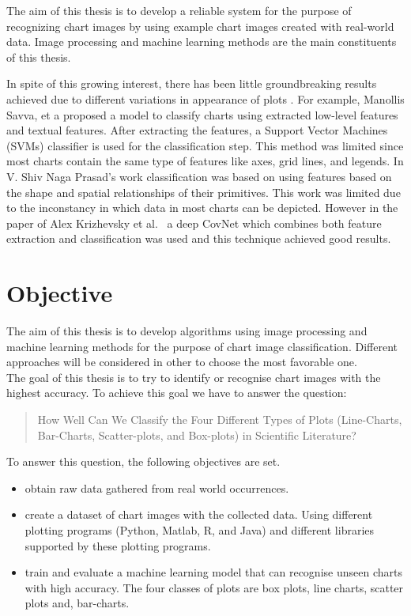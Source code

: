 \documentclass[12pt, a4paper,oneside]{report}
\begin{document}
The aim of this thesis is to develop a reliable system for the purpose of recognizing chart images by using example chart images created with real-world data. Image processing and machine learning methods are the main constituents of this thesis. 

In spite of this growing interest, there has been little groundbreaking results achieved due to different variations in appearance of plots \cite{liu2015chart}. For example, Manollis Savva, et a \cite{savva2011revision} proposed a model to classify charts using extracted low-level features and textual features. After extracting the features, a  Support Vector Machines (SVMs) classifier is used for the classification step. This method was limited since most charts contain the same type of features like axes, grid lines, and legends. In V. Shiv Naga Prasad's work \cite{prasad2007classifying} classification was based on using features based on the shape and spatial relationships of their primitives. This work was limited due to the inconstancy in which data in most charts can be depicted. However in the paper of Alex Krizhevsky et al.~\cite{krizhevsky2012imagenet} a deep CovNet which combines both feature extraction and classification was used and this technique achieved good results.

\section{Objective}
The aim of this thesis is to develop algorithms using image processing and machine learning methods for the purpose of chart image classification. Different approaches will be considered in other to choose the most favorable one.\\
The goal of this thesis is to try to identify or recognise chart images with the highest accuracy. To achieve this goal we have to answer the question: \begin{quote} How Well Can We Classify the Four Different Types of Plots (Line-Charts, Bar-Charts, Scatter-plots, and Box-plots) in Scientific Literature? \end{quote} 
To answer this question, the following objectives are set.

\begin{itemize}\itemsep3pt
	\item obtain raw data gathered from real world occurrences.
	\item create a dataset of chart images with the collected data. Using  different plotting programs (Python, Matlab, R, and Java) and different libraries supported by these plotting programs.
	\item train and evaluate a machine learning model that can recognise unseen charts with high accuracy. The four classes of plots are box plots, line charts, scatter plots and, bar-charts.
\end{itemize}
\end{document}
